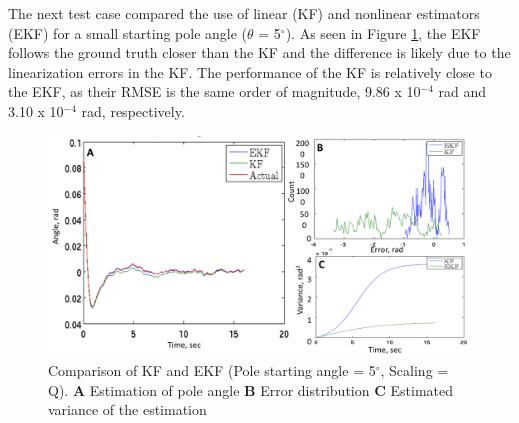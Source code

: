 \documentclass{article}
\begin{document}
 The next test case compared the use of linear (KF) and nonlinear estimators (EKF) for a small starting pole angle ($\theta$ = 5$^{\circ}$).  As seen in Figure \ref{fig:5degKFvEKF}, the EKF follows the ground truth closer than the KF and the difference is likely due to the linearization errors in the KF.  The performance of the KF is relatively close to the EKF, as their RMSE is the same order of magnitude, 9.86 x 10$^{-4}$ rad and 3.10 x 10$^{-4}$ rad, respectively.
 \begin{figure}[h!]
 	\centering
 	\includegraphics[width=15cm,keepaspectratio]{5degKFvEKF.png}
 	\caption{Comparison of KF and EKF (Pole starting angle = 5$^{\circ}$, Scaling = Q). \textbf{A} Estimation of pole angle \textbf{B} Error distribution \textbf{C} Estimated variance of the estimation}
 	\label{fig:5degKFvEKF}
 \end{figure}
\end{document}
